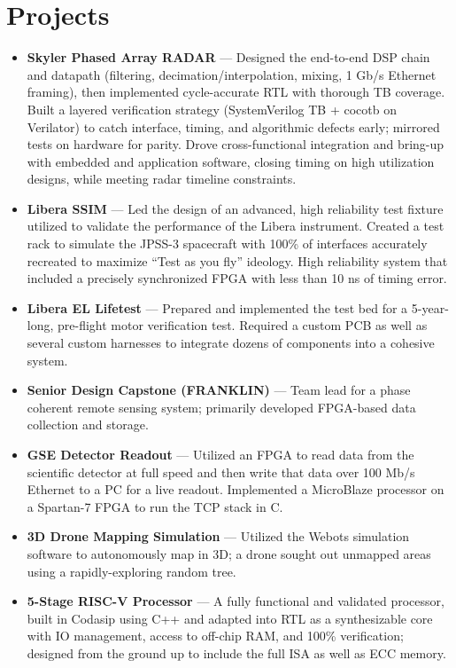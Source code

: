 \documentclass[11pt]{article}
\begin{document}
\section*{Projects}
\begin{itemize}[leftmargin=*]
\item \textbf{Skyler Phased Array RADAR} --- Designed the end-to-end DSP chain and datapath (filtering, decimation/interpolation, mixing, 1 Gb/s Ethernet framing), then implemented cycle-accurate RTL with thorough TB coverage. Built a layered verification strategy (SystemVerilog TB + cocotb on Verilator) to catch interface, timing, and algorithmic defects early; mirrored tests on hardware for parity. Drove cross-functional integration and bring-up with embedded and application software, closing timing on high utilization designs, while meeting radar timeline constraints.
\item \textbf{Libera SSIM} --- Led the design of an advanced, high reliability test fixture utilized to validate the performance of the Libera instrument. Created a test rack to simulate the JPSS-3 spacecraft with 100\% of interfaces accurately recreated to maximize ``Test as you fly'' ideology. High reliability system that included a precisely synchronized FPGA with less than 10 ns of timing error.
\item \textbf{Libera EL Lifetest} --- Prepared and implemented the test bed for a 5-year-long, pre-flight motor verification test. Required a custom PCB as well as several custom harnesses to integrate dozens of components into a cohesive system.
\item \textbf{Senior Design Capstone (FRANKLIN)} --- Team lead for a phase coherent remote sensing system; primarily developed FPGA-based data collection and storage.
\item \textbf{GSE Detector Readout} --- Utilized an FPGA to read data from the scientific detector at full speed and then write that data over 100 Mb/s Ethernet to a PC for a live readout. Implemented a MicroBlaze processor on a Spartan-7 FPGA to run the TCP stack in C.
\item \textbf{3D Drone Mapping Simulation} --- Utilized the Webots simulation software to autonomously map in 3D; a drone sought out unmapped areas using a rapidly-exploring random tree.
\item \textbf{5-Stage RISC-V Processor} --- A fully functional and validated processor, built in Codasip using C++ and adapted into RTL as a synthesizable core with IO management, access to off-chip RAM, and 100\% verification; designed from the ground up to include the full ISA as well as ECC memory.
\end{itemize}
\end{document}
